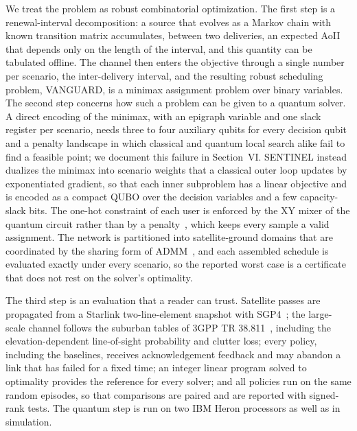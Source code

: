 We treat the problem as robust combinatorial optimization. The first step is a renewal-interval decomposition: a source
that evolves as a Markov chain with known transition matrix accumulates, between two deliveries, an expected AoII that
depends only on the length of the interval, and this quantity can be tabulated offline. The channel then enters the
objective through a single number per scenario, the inter-delivery interval, and the resulting robust scheduling
problem, VANGUARD, is a minimax assignment problem over binary variables. The second step concerns how such a problem
can be given to a quantum solver. A direct encoding of the minimax, with an epigraph variable and one slack register
per scenario, needs three to four auxiliary qubits for every decision qubit and a penalty landscape in which classical
and quantum local search alike fail to find a feasible point; we document this failure in Section~VI. SENTINEL instead
dualizes the minimax into scenario weights that a classical outer loop updates by exponentiated gradient, so that each
inner subproblem has a linear objective and is encoded as a compact QUBO over the decision variables and a few
capacity-slack bits. The one-hot constraint of each user is enforced by the XY mixer of the quantum circuit rather
than by a penalty~\cite{Hadfield2019}, which keeps every sample a valid assignment. The network is partitioned into
satellite-ground domains that are coordinated by the sharing form of ADMM~\cite{Boyd2011}, and each assembled schedule
is evaluated exactly under every scenario, so the reported worst case is a certificate that does not rest on the
solver's optimality.

The third step is an evaluation that a reader can trust. Satellite passes are propagated from a Starlink
two-line-element snapshot with SGP4~\cite{Vallado2006}; the large-scale channel follows the suburban tables of
3GPP TR 38.811~\cite{TR38811}, including the elevation-dependent line-of-sight probability and clutter loss; every
policy, including the baselines, receives acknowledgement feedback and may abandon a link that has failed for a fixed
time; an integer linear program solved to optimality provides the reference for every solver; and all policies run on
the same random episodes, so that comparisons are paired and are reported with signed-rank tests. The quantum step is
run on two IBM Heron processors as well as in simulation.

